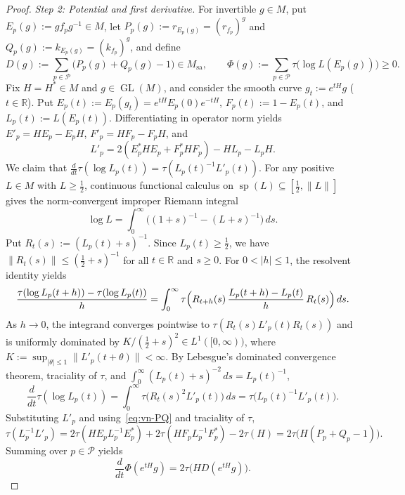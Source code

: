 \documentclass[11pt]{article}
\theoremstyle{definition}
\theoremstyle{remark}
\numberwithin{equation}{section}
\DeclareMathOperator{\GL}{GL}
\DeclareMathOperator{\spn}{sp}
\newcommand{\R}{\mathbb{R}}
\newcommand{\PP}{\mathcal{P}}
\newcommand{\1}{\mathbf{1}}
\begin{document}
\begin{proof}
\emph{Step 2: Potential and first derivative.}
For invertible $g \in M$, put $E_p(g) := g f_p g^{-1} \in M$, let $P_p(g) := r_{E_p(g)} = (r_{f_p})^g$ and $Q_p(g) := k_{E_p(g)} = (k_{f_p})^g$, and define
\[
D(g) := \sum_{p \in \PP} \bigl(P_p(g) + Q_p(g) - 1\bigr) \in M_{\mathrm{sa}}, \qquad
\Phi(g) := \sum_{p \in \PP} \tau\bigl(\log L(E_p(g))\bigr) \ge 0.
\]
Fix $H = H^* \in M$ and $g \in \GL(M)$, and consider the smooth curve $g_t := e^{tH} g$ ($t \in \R$). Put $E_p(t) := E_p(g_t) = e^{tH} E_p(0) e^{-tH}$, $F_p(t) := 1 - E_p(t)$, and $L_p(t) := L(E_p(t))$. Differentiating in operator norm yields $E'_p = H E_p - E_p H$, $F'_p = H F_p - F_p H$, and
\[
L'_p = 2(E_p^* H E_p + F_p^* H F_p) - H L_p - L_p H.
\]
We claim that $\frac{d}{dt}\tau(\log L_p(t)) = \tau(L_p(t)^{-1} L'_p(t))$. For any positive $L \in M$ with $L \ge \frac{1}{2}$, continuous functional calculus on $\spn(L) \subseteq [\frac{1}{2}, \|L\|]$ gives the norm-convergent improper Riemann integral
\[
\log L = \int_0^\infty \bigl((1 + s)^{-1} - (L + s)^{-1}\bigr)\, ds.
\]
Put $R_t(s) := (L_p(t) + s)^{-1}$. Since $L_p(t) \ge \frac{1}{2}$, we have $\|R_t(s)\| \le (\frac{1}{2} + s)^{-1}$ for all $t \in \R$ and $s \ge 0$. For $0 < |h| \le 1$, the resolvent identity yields
\[
\frac{\tau(\log L_p(t+h)) - \tau(\log L_p(t))}{h}
= \int_0^\infty \tau\Bigl(R_{t+h}(s)\,\frac{L_p(t+h) - L_p(t)}{h}\, R_t(s)\Bigr)\, ds.
\]
As $h \to 0$, the integrand converges pointwise to $\tau(R_t(s) L'_p(t) R_t(s))$ and is uniformly dominated by $K / (\frac{1}{2} + s)^2 \in L^1([0, \infty))$, where $K := \sup_{|\theta| \le 1} \|L'_p(t + \theta)\| < \infty$. By Lebesgue's dominated convergence theorem, traciality of $\tau$, and $\int_0^\infty (L_p(t) + s)^{-2}\, ds = L_p(t)^{-1}$,
\[
\frac{d}{dt}\tau(\log L_p(t))
= \int_0^\infty \tau\bigl(R_t(s)^2 L'_p(t)\bigr)\, ds
= \tau\bigl(L_p(t)^{-1} L'_p(t)\bigr).
\]
Substituting $L'_p$ and using~\eqref{eq:vn-PQ} and traciality of $\tau$,
\[
\tau(L_p^{-1} L'_p) = 2\tau(H E_p L_p^{-1} E_p^*) + 2\tau(H F_p L_p^{-1} F_p^*) - 2\tau(H) = 2\tau\bigl(H(P_p + Q_p - 1)\bigr).
\]
Summing over $p \in \PP$ yields
\begin{equation}
\label{eq:vn-d1}
\frac{d}{dt}\Phi(e^{tH} g) = 2\tau\bigl(H D(e^{tH} g)\bigr).
\end{equation}


\end{proof}
\end{document}
